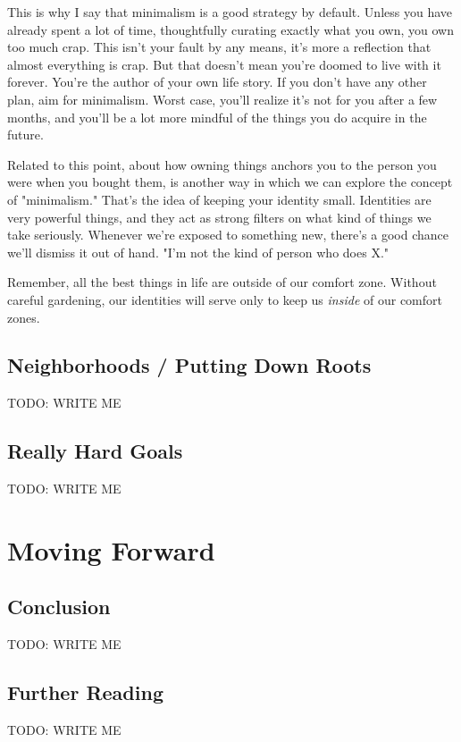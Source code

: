 \documentclass[]{book}
\newcommand{\TOWRITE}{TODO: WRITE ME}
\begin{document}
This is why I say that minimalism is a good strategy by default. Unless you have
already spent a lot of time, thoughtfully curating exactly what you own, you own
too much crap. This isn't your fault by any means, it's more a reflection that
almost everything is crap. But that doesn't mean you're doomed to live with it
forever. You're the author of your own life story. If you don't have any other
plan, aim for minimalism. Worst case, you'll realize it's not for you after a
few months, and you'll be a lot more mindful of the things you do acquire in the
future.

Related to this point, about how owning things anchors you to the person you
were when you bought them, is another way in which we can explore the concept of
"minimalism." That's the idea of keeping your identity small. Identities are
very powerful things, and they act as strong filters on what kind of things we
take seriously. Whenever we're exposed to something new, there's a good chance
we'll dismiss it out of hand. "I'm not the kind of person who does X."

Remember, all the best things in life are outside of our comfort zone. Without
careful gardening, our identities will serve only to keep us \emph{inside} of
our comfort zones.

\chapter{Neighborhoods / Putting Down Roots}
\TOWRITE

\chapter{Really Hard Goals}
\TOWRITE


\part{Moving Forward}

\chapter{Conclusion}
\TOWRITE

\chapter{Further Reading}
\TOWRITE
\end{document}

